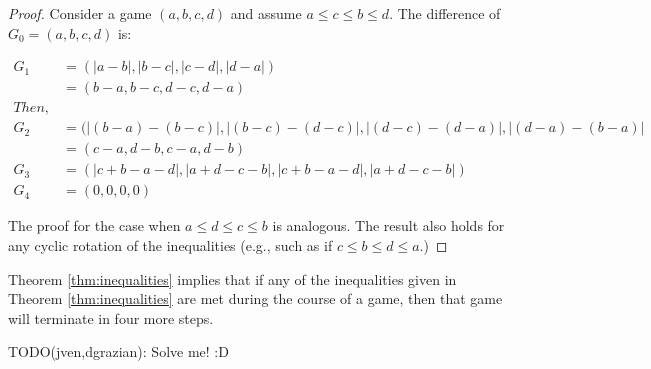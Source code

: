 \documentclass[12pt]{amsart}
\begin{document}
\begin{proof}
Consider a game $(a,b,c,d)$ and assume $a \leq c \leq b \leq d$. The difference of $G_0 =  (a, b, c, d)$ is:

\begin{align*}
G_1 &= (|a-b|, |b-c|, |c-d|, |d-a|) \\
&=(b-a, b-c, d-c, d-a)\\
Then, \\
G_2 &= (|(b-a) - (b-c)|, |(b-c) - (d-c)|, |(d-c) - (d-a)|, |(d-a) - (b-a)| \\
&= (c-a, d-b, c-a, d-b)\\
G_3 &= (|c + b - a - d|, |a + d - c - b|, |c + b - a - d|, |a + d - c - b|)\\
G_4 &= (0,0,0,0)
\end{align*}

The proof for the case when $a \leq d \leq c \leq b$ is analogous. The result also holds for any cyclic rotation of the inequalities (e.g., such as if $c \leq b \leq d \leq a$.)
\end{proof}

Theorem \ref{thm:inequalities} implies that if any of the inequalities given in Theorem \ref{thm:inequalities} are met during the course of a game, then that game will terminate in four more steps.


TODO(jven,dgrazian): Solve me! :D
\end{document}
